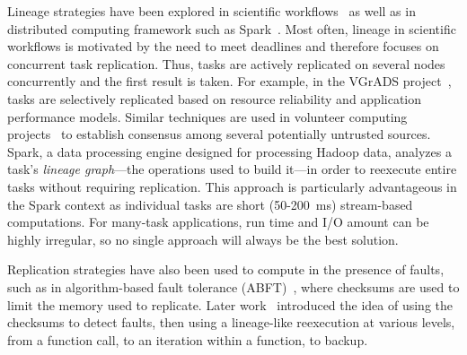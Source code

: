 \documentclass{sig-alternate}
\newcommand{\zhaonote}[1]{{\textcolor{cyan}    { ***Zhao:      #1 }}}
\newcommand{\zhaonote}[1]{}
\begin{document}
Lineage strategies have been explored in scientific workflows~\cite{ramakrishnan09vgrads, calheiros13deadlines, Chimera2002} as well as in distributed computing framework such as Spark~\cite{RDD2012}. Most often, lineage in scientific workflows is motivated by the need to meet deadlines and therefore focuses on concurrent task replication. Thus, tasks are actively replicated on several nodes concurrently and the first result is taken. For example, in the VGrADS project~\cite{ramakrishnan09vgrads}, tasks are selectively replicated based on resource reliability and application performance models. Similar techniques are used in volunteer computing projects~\cite{boinc04} to establish consensus among several potentially untrusted sources. Spark, a data processing engine designed for processing Hadoop data, analyzes a task's \emph{lineage graph}---the operations used to build it---in order to reexecute entire tasks without requiring replication. This approach is particularly advantageous in the Spark context as individual tasks are short (50-200~ms) stream-based computations. %
For many-task applications, run time and I/O amount can be highly irregular, so no single approach will always be the best solution.

Replication strategies have also been used to compute in the presence of faults, such as in algorithm-based fault tolerance (ABFT)~\cite{abft}, where checksums are used to limit the memory used to replicate.  Later work~\cite{turmon1, turmon2, gunnels} introduced the idea of using the checksums to detect faults, then using a lineage-like reexecution at various levels, from a function call, to an iteration within a function, to backup.
\end{document}
